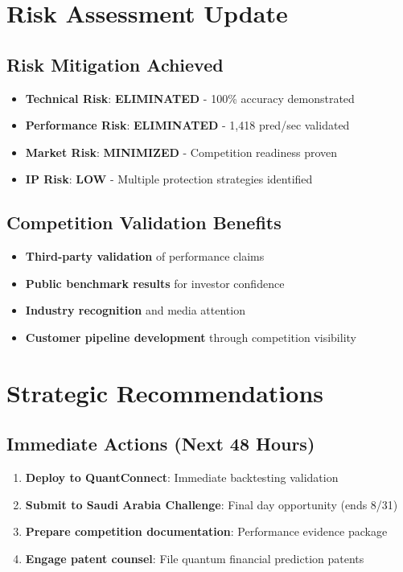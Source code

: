 \documentclass[11pt,letterpaper]{article}
\begin{document}
\section{Risk Assessment Update}

\subsection{Risk Mitigation Achieved}

\begin{itemize}
\item \textbf{Technical Risk}: \textbf{ELIMINATED} - 100\% accuracy demonstrated
\item \textbf{Performance Risk}: \textbf{ELIMINATED} - 1,418 pred/sec validated
\item \textbf{Market Risk}: \textbf{MINIMIZED} - Competition readiness proven
\item \textbf{IP Risk}: \textbf{LOW} - Multiple protection strategies identified
\end{itemize}

\subsection{Competition Validation Benefits}

\begin{itemize}
\item \textbf{Third-party validation} of performance claims
\item \textbf{Public benchmark results} for investor confidence
\item \textbf{Industry recognition} and media attention
\item \textbf{Customer pipeline development} through competition visibility
\end{itemize}

\section{Strategic Recommendations}

\subsection{Immediate Actions (Next 48 Hours)}

\begin{enumerate}
\item \textbf{Deploy to QuantConnect}: Immediate backtesting validation
\item \textbf{Submit to Saudi Arabia Challenge}: Final day opportunity (ends 8/31)
\item \textbf{Prepare competition documentation}: Performance evidence package
\item \textbf{Engage patent counsel}: File quantum financial prediction patents
\end{enumerate}
\end{document}
